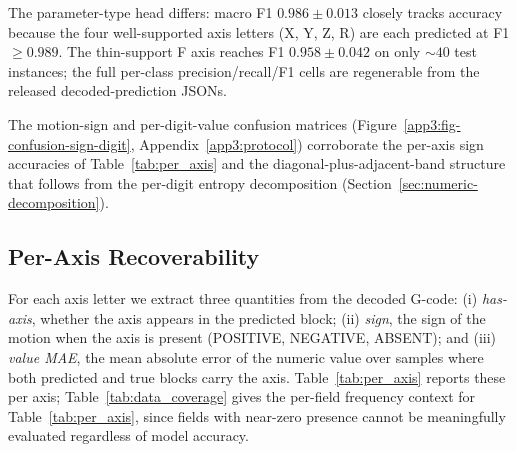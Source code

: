 \documentclass[sensors,article,submit,moreauthors,pdftex]{Definitions/mdpi}
\begin{document}
The parameter-type head differs: macro F1 $0.986 \pm 0.013$ closely tracks accuracy because the four well-supported axis letters (X, Y, Z, R) are each predicted at F1 $\ge\!0.989$. The thin-support F axis reaches F1 $0.958 \pm 0.042$ on only $\sim$$40$ test instances; the full per-class precision/recall/F1 cells are regenerable from the released decoded-prediction JSONs.

The motion-sign and per-digit-value confusion matrices (Figure~\ref{app3:fig-confusion-sign-digit}, Appendix~\ref{app3:protocol}) corroborate the per-axis sign accuracies of Table~\ref{tab:per_axis} and the diagonal-plus-adjacent-band structure that follows from the per-digit entropy decomposition (Section~\ref{sec:numeric-decomposition}).

\subsection{Per-Axis Recoverability}
\label{sec:per-axis}

For each axis letter we extract three quantities from the decoded G-code: (i) \emph{has-axis}, whether the axis appears in the predicted block; (ii) \emph{sign}, the sign of the motion when the axis is present (POSITIVE, NEGATIVE, ABSENT); and (iii) \emph{value MAE}, the mean absolute error of the numeric value over samples where both predicted and true blocks carry the axis. Table~\ref{tab:per_axis} reports these per axis; Table~\ref{tab:data_coverage} gives the per-field frequency context for Table~\ref{tab:per_axis}, since fields with near-zero presence cannot be meaningfully evaluated regardless of model accuracy.




\end{document}

